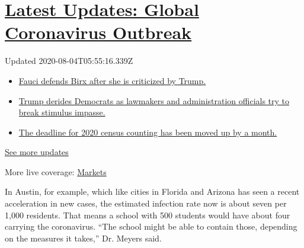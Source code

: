 \hypertarget{latest-updates-global-coronavirus-outbreak}{%
\section{\texorpdfstring{\href{https://www.nytimes.com/2020/08/03/world/coronavirus-covid-19.html?action=click\&pgtype=Article\&state=default\&region=MAIN_CONTENT_1\&context=storylines_live_updates}{Latest
Updates: Global Coronavirus
Outbreak}}{Latest Updates: Global Coronavirus Outbreak}}\label{latest-updates-global-coronavirus-outbreak}}

Updated 2020-08-04T05:55:16.339Z

\begin{itemize}
\tightlist
\item
  \href{https://www.nytimes.com/2020/08/03/world/coronavirus-covid-19.html?action=click\&pgtype=Article\&state=default\&region=MAIN_CONTENT_1\&context=storylines_live_updates\#link-4547638f}{Fauci
  defends Birx after she is criticized by Trump.}
\item
  \href{https://www.nytimes.com/2020/08/03/world/coronavirus-covid-19.html?action=click\&pgtype=Article\&state=default\&region=MAIN_CONTENT_1\&context=storylines_live_updates\#link-15e7f995}{Trump
  derides Democrats as lawmakers and administration officials try to
  break stimulus impasse.}
\item
  \href{https://www.nytimes.com/2020/08/03/world/coronavirus-covid-19.html?action=click\&pgtype=Article\&state=default\&region=MAIN_CONTENT_1\&context=storylines_live_updates\#link-e5a2cda}{The
  deadline for 2020 census counting has been moved up by a month.}
\end{itemize}

\href{https://www.nytimes.com/2020/08/03/world/coronavirus-covid-19.html?action=click\&pgtype=Article\&state=default\&region=MAIN_CONTENT_1\&context=storylines_live_updates}{See
more updates}

More live coverage:
\href{https://www.nytimes.com/live/2020/08/03/business/stock-market-today-coronavirus?action=click\&pgtype=Article\&state=default\&region=MAIN_CONTENT_1\&context=storylines_live_updates}{Markets}

In Austin, for example, which like cities in Florida and Arizona has
seen a recent acceleration in new cases, the estimated infection rate
now is about seven per 1,000 residents. That means a school with 500
students would have about four carrying the coronavirus. ``The school
might be able to contain those, depending on the measures it takes,''
Dr. Meyers said.

